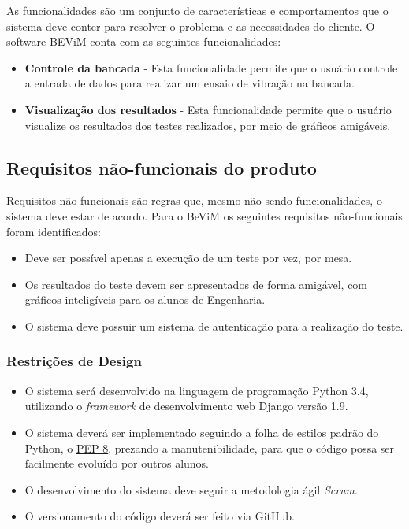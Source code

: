     	As funcionalidades são um conjunto de características e comportamentos que o sistema deve conter para resolver o problema e as necessidades do cliente. O software BEViM conta com as seguintes funcionalidades:
        
        \begin{itemize}
          	\item \textbf{Controle da bancada} - Esta funcionalidade permite que o usuário controle a entrada de dados para realizar um ensaio de vibração na bancada.
            \item \textbf{Visualização dos resultados} - Esta funcionalidade permite que o usuário visualize os resultados dos testes realizados, por meio de gráficos amigáveis.
        \end{itemize}
    
    \subsection*{Requisitos não-funcionais do produto}
    
    	Requisitos não-funcionais são regras que, mesmo não sendo funcionalidades, o sistema deve estar de acordo. Para o BeViM os seguintes requisitos não-funcionais foram identificados:
        
        \begin{itemize}
            \item Deve ser possível apenas a execução de um teste por vez, por mesa.
            \item Os resultados do teste devem ser apresentados de forma amigável, com gráficos inteligíveis para os alunos de Engenharia.
            \item O sistema deve possuir um sistema de autenticação para a realização do teste.

        \end{itemize}
        
        \subsubsection*{Restrições de Design}
        	
            \begin{itemize}
                \item O sistema será desenvolvido na linguagem de programação Python 3.4, utilizando o \textit{framework} de desenvolvimento web Django versão 1.9.
                \item O sistema deverá ser implementado seguindo a folha de estilos padrão do Python, o \href{https://www.python.org/dev/peps/pep-0008/}{PEP 8}, prezando a manutenibilidade, para que o código possa ser facilmente evoluído por outros alunos.
                \item O desenvolvimento do sistema deve seguir a metodologia ágil \textit{Scrum}.
                
                \item O versionamento do código deverá ser feito via GitHub.
            \end{itemize}
    
